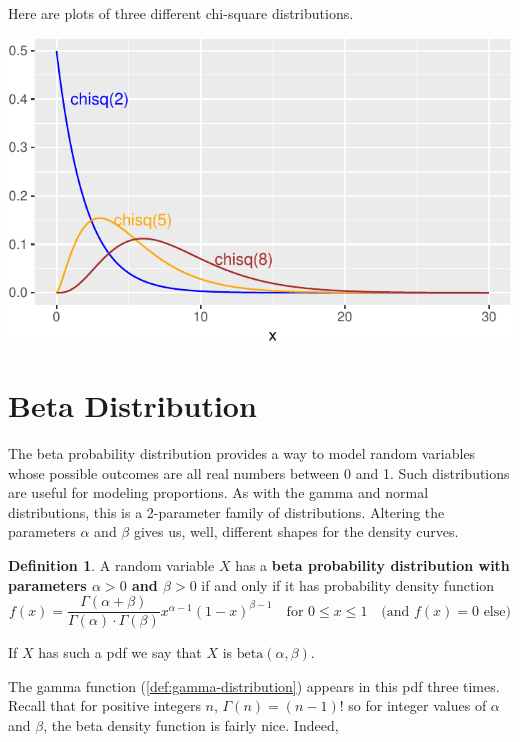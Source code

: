 \documentclass[
]{book}
\theoremstyle{definition}
\newtheorem{definition}{Definition}[chapter]
\theoremstyle{definition}
\theoremstyle{definition}
\theoremstyle{definition}
\theoremstyle{remark}
\begin{document}
Here are plots of three different chi-square distributions.

\begin{center}\includegraphics{math340-notes_files/figure-latex/unnamed-chunk-24-1} \end{center}

\section{Beta Distribution}\label{beta-distribution}

The beta probability distribution provides a way to model random variables whose possible outcomes are all real numbers between 0 and 1. Such distributions are useful for modeling proportions. As with the gamma and normal distributions, this is a 2-parameter family of distributions. Altering the parameters \(\alpha\) and \(\beta\) gives us, well, different shapes for the density curves.

\begin{definition}
\protect\hypertarget{def:beta-distribution}{}\label{def:beta-distribution}A random variable \(X\) has a \textbf{beta probability distribution with parameters \(\alpha>0\) and \(\beta>0\)} if and only if it has probability density function
\[
f(x)=
\frac{\Gamma(\alpha + \beta)}{\Gamma(\alpha)\cdot \Gamma(\beta)}x^{\alpha-1}(1-x)^{\beta-1}~~~ \text{ for }0 \leq x \leq 1~~~ \text{ (and }f(x) = 0\text{ else)}
\]

If \(X\) has such a pdf we say that \(X\) is \(\text{beta}(\alpha,\beta)\).
\end{definition}

The gamma function (\ref{def:gamma-distribution}) appears in this pdf three times. Recall that for positive integers \(n\), \(\Gamma(n) = (n-1)!\) so for integer values of \(\alpha\) and \(\beta\), the beta density function is fairly nice.
Indeed,
\end{document}
